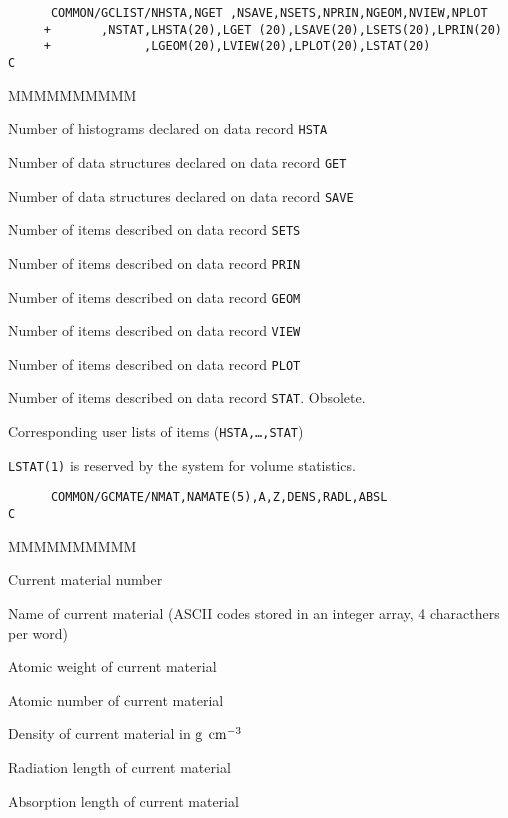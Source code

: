 \begin{verbatim}
      COMMON/GCLIST/NHSTA,NGET ,NSAVE,NSETS,NPRIN,NGEOM,NVIEW,NPLOT
     +       ,NSTAT,LHSTA(20),LGET (20),LSAVE(20),LSETS(20),LPRIN(20)
     +             ,LGEOM(20),LVIEW(20),LPLOT(20),LSTAT(20)
C
\end{verbatim}
\begin{DLtt}{MMMMMMMMMM}
\item[NHSTA] Number of histograms declared on data record {\tt HSTA }
\item[NGET] Number of data structures declared on data record {\tt GET}
\item[NSAVE]Number of data structures declared on data record {\tt SAVE}
\item[NSETS]Number of items described on data record {\tt SETS}
\item[NPRIN]Number of items described on data record {\tt PRIN}
\item[NGEOM]Number of items described on data record {\tt GEOM}
\item[NVIEW]Number of items described on data record {\tt VIEW}
\item[NPLOT]Number of items described on data record {\tt PLOT}
\item[NSTAT]Number of items described on data record {\tt STAT}. Obsolete.
\item[LHSTA,\ldots LSTAT]Corresponding user lists of items
({\tt HSTA,\ldots,STAT})
\end{DLtt}
{\tt LSTAT(1)} is reserved by the system for volume statistics.
\begin{verbatim}
      COMMON/GCMATE/NMAT,NAMATE(5),A,Z,DENS,RADL,ABSL
C
\end{verbatim}
\begin{DLtt}{MMMMMMMMMM}
\item[NMAT]  Current material number
\item[NAMATE]Name of current material (ASCII codes stored in an integer
array, 4 characthers per word)
\item[A]Atomic weight of current material
\item[Z]Atomic number of current material
\item[DENS]Density of current material in ${\rm g \: \: cm^{-3}}$
\item[RADL]Radiation length of current material
\item[ABSL]Absorption length of current material
\end{DLtt}
 
